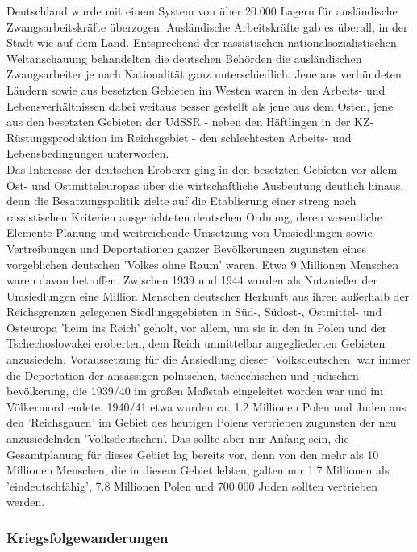 \documentclass[letterpaper, 12pt]{article}
\let\tempsubsubsection\subsubsection
\renewcommand\subsubsection[1]{\vspace{0cm}\tempsubsubsection{#1}\vspace{0cm}}
\begin{document}
Deutschland wurde mit einem System von über 20.000 Lagern für ausländische Zwangsarbeitskräfte überzogen. Ausländische Arbeitskräfte gab es überall, in der Stadt wie auf dem Land. Entsprechend der rassistischen nationalsozialistischen Weltanschauung behandelten die deutschen Behörden die ausländischen Zwangsarbeiter je nach Nationalität ganz unterschiedlich. Jene aus verbündeten Ländern sowie aus besetzten Gebieten im Westen waren in den Arbeits- und Lebensverhältnissen dabei weitaus besser gestellt als jene aus dem Osten, jene aus den besetzten Gebieten der UdSSR - neben den Häftlingen in der KZ-Rüstungsproduktion im Reichsgebiet - den schlechtesten Arbeits- und Lebensbedingungen unterworfen.\\
Das Interesse der deutschen Eroberer ging in den besetzten Gebieten vor allem Ost- und Ostmitteleuropas über die wirtschaftliche Ausbeutung deutlich hinaus, denn die Besatzungspolitik zielte auf die Etablierung einer streng nach rassistischen Kriterien ausgerichteten deutschen Ordnung, deren wesentliche Elemente Planung und weitreichende Umsetzung von Umsiedlungen sowie Vertreibungen und Deportationen ganzer Bevölkerungen zugunsten eines vorgeblichen deutschen 'Volkes ohne Raum' waren. Etwa 9 Millionen Menschen waren davon betroffen. Zwischen 1939 und 1944 wurden als Nutznießer der Umsiedlungen eine Million Menschen deutscher Herkunft aus ihren außerhalb der Reichsgrenzen gelegenen Siedlungsgebieten in Süd-, Südost-, Ostmittel- und Osteuropa 'heim ins Reich' geholt, vor allem, um sie in den in Polen und der Tschechoslowakei eroberten, dem Reich unmittelbar angegliederten Gebieten anzusiedeln. Voraussetzung für die Ansiedlung dieser 'Volksdeutschen' war immer die Deportation der ansässigen polnischen, tschechischen und jüdischen bevölkerung, die 1939/40 im großen Maßstab eingeleitet worden war und im Völkermord endete. 1940/41 etwa wurden ca. 1.2 Millionen Polen und Juden aus den 'Reichsgauen' im Gebiet des heutigen Polens vertrieben zugunsten der neu anzusiedelnden 'Volksdeutschen'. Das sollte aber nur Anfang sein, die Gesamtplanung für dieses Gebiet lag bereits vor, denn von den mehr als 10 Millionen Menschen, die in diesem Gebiet lebten, galten nur 1.7 Millionen als 'eindeutschfähig', 7.8 Millionen Polen und 700.000 Juden sollten vertrieben werden.

\subsubsection{Kriegsfolgewanderungen}
\end{document}

